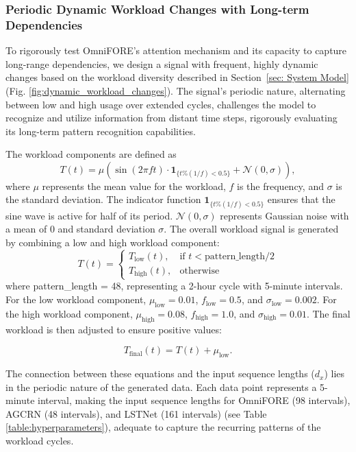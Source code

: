 \documentclass{ieeetmlcn}
\begin{document}
\subsubsection{\textbf{Periodic Dynamic Workload Changes with Long-term Dependencies}}

To rigorously test OmniFORE's attention mechanism and its capacity to capture long-range dependencies, we design a signal with frequent, highly dynamic changes based on the workload diversity described in Section~\ref{sec: System Model} (Fig. \ref{fig:dynamic_workload_changes}). The signal's periodic nature, alternating between low and high usage over extended cycles, challenges the model to recognize and utilize information from distant time steps, rigorously evaluating its long-term pattern recognition capabilities.

The workload components are defined as 
\begin{equation}
T(t) = \mu \left( \sin(2\pi f t) \cdot \mathbf{1}_{\{t \% (1/f) < 0.5\}} + \mathcal{N}(0, \sigma) \right),
\end{equation}
where $\mu$ represents the mean value for the workload, $f$ is the frequency, and $\sigma$ is the standard deviation. The indicator function $\mathbf{1}_{\{t \% (1/f) < 0.5\}}$ ensures that the sine wave is active for half of its period. $\mathcal{N}(0, \sigma)$ represents Gaussian noise with a mean of 0 and standard deviation $\sigma$. The overall workload signal is generated by combining a low and high workload component:
\begin{equation}
T(t) = \begin{cases} 
T_{\text{low}}(t), & \text{if } t < \text{pattern\_length} / 2 \\
T_{\text{high}}(t), & \text{otherwise}
\end{cases}
\end{equation}
where pattern\_length = 48, representing a 2-hour cycle with 5-minute intervals.
For the low workload component, $\mu_{\text{low}} = 0.01$, $f_{\text{low}} = 0.5$, and $\sigma_{\text{low}} = 0.002$. For the high workload component, $\mu_{\text{high}} = 0.08$, $f_{\text{high}} = 1.0$, and $\sigma_{\text{high}} = 0.01$. The final workload is then adjusted to ensure positive values:

\begin{equation}
T_{\text{final}}(t) = T(t) + \mu_{\text{low}}.
\end{equation}

The connection between these equations and the input sequence lengths ($d_x$) lies in the periodic nature of the generated data. Each data point represents a 5-minute interval, making the input sequence lengths for OmniFORE (98 intervals), AGCRN (48 intervals), and LSTNet (161 intervals) (see Table \ref{table:hyperparameters}), adequate to capture the recurring patterns of the workload cycles.
\end{document}
